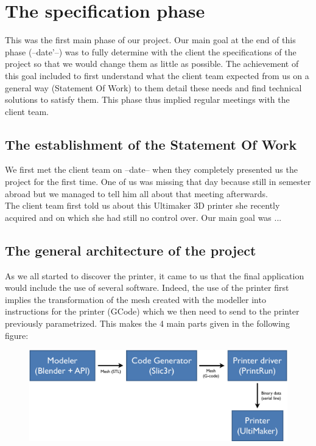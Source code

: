 \documentclass{report}
\begin{document}
\chapter{The specification phase}

This was the first main phase of our project. Our main goal at the end of this phase (--date'--)  was to fully determine with the client the specifications of the project so that we would change them as little as possible. The achievement  of this goal included to first understand what the client team expected from us on a general way (Statement Of Work) to them detail these needs and find technical solutions to satisfy them. This phase thus implied regular meetings with the client team.

\section{The establishment of the Statement Of Work}

We first met the client team on --date-- when they completely presented us the project for the first time. One of us was missing that day because still in semester abroad but we managed to tell him all about that meeting afterwards. \\

The client team first told us about this Ultimaker 3D printer she recently acquired and on which she had still no control over. Our main goal was ...

\section{The general architecture of the project}

As we all started to discover the printer, it came to us that the final application would include the use of several software. Indeed, the use of the printer first implies the transformation of the mesh created with the modeller into instructions for the printer (GCode) which we then need to send to the printer previously parametrized. This makes the 4 main parts given in the following figure:

\begin{figure}[!h]
\begin{center}
	\includegraphics[width=.8\textwidth]{schema}
\end{center}
\end{figure}
\end{document}
